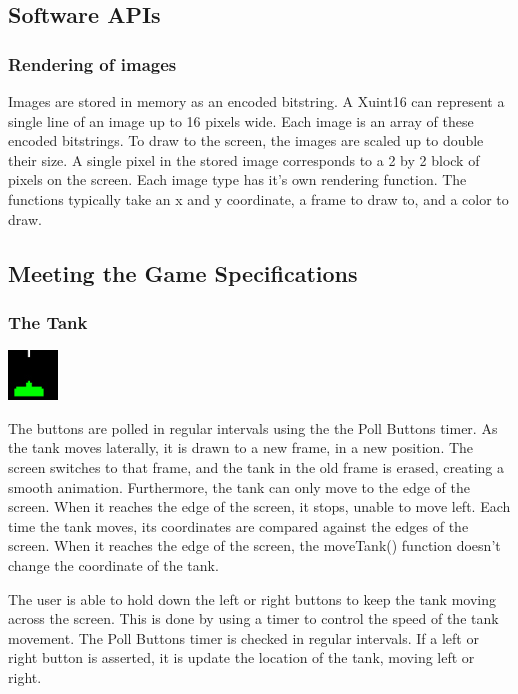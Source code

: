 \documentclass[11pt,letter,oneside]{report}
\begin{document}
\subsection{Software APIs}
\subsubsection{Rendering of images}
Images are stored in memory as an encoded bitstring.  A Xuint16 can represent a single line of an image up to 16 pixels wide.  Each image is an array of these encoded bitstrings.  To draw to the screen, the images are scaled up to double their size.  A single pixel in the stored image corresponds to a 2 by 2 block of pixels on the screen. Each image type has it's own rendering function.  The functions typically take an x and y coordinate, a frame to draw to, and a color to draw.

\subsection{Meeting the Game Specifications}

\subsubsection{The Tank}
\includegraphics[]{tank.jpg}

The buttons are polled in regular intervals using the the Poll Buttons timer. As the tank moves laterally, it is drawn to a new frame, in a new position. The screen switches to that frame, and the tank in the old frame is erased, creating a smooth animation. Furthermore, the tank can only move to the edge of the screen. When it reaches the edge of the screen, it stops, unable to move left. Each time the tank moves, its coordinates are compared against the edges of the screen. When it reaches the edge of the screen, the moveTank() function doesn't change the coordinate of the tank.

The user is able to hold down the left or right buttons to keep the tank moving across the screen. This is done by using a timer to control the speed of the tank movement. The Poll Buttons timer is checked in regular intervals. If a left or right button is asserted, it is update the location of the tank, moving left or right.
\end{document}
